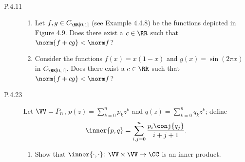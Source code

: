 \documentclass{homework}
\begin{document}
\begin{description}
  \begin{solution}

  \end{solution}

\item[P.4.11]
  \begin{enumerate}
  \item Let \(f, g \in C_\RR [0, 1]\) (see Example 4.4.8) be the
    functions depicted in Figure 4.9.  Does there exist a
    \(c \in \RR\) such that \(\norm{f + cg} < \norm f\)?

    \begin{solution}

    \end{solution}

  \item Consider the functions \(f(x) = x(1-x)\) and
    \(g(x) = \sin(2\pi x)\) in \(C_\RR [0, 1]\).  Does there exist a
    \(c \in \RR\) such that \(\norm{f + cg} < \norm f\)?

    \begin{solution}

    \end{solution}
  \end{enumerate}
  \begin{center}
    \hfil
    \hfil
    \hfil
  \end{center}

\item[P.4.23]
  Let \(\VV = P_n\), \(p(z) = \sum_{k=0}^n p_k z^k\) and
  \(q(z) = \sum_{k=0}^n q_k z^k\); define
  \[
    \inner{p, q} = \sum_{i,j=0}^n \frac{p_i \conj{q_j}}{i+j+1}.
  \]
  \begin{enumerate}
  \item Show that
    \(\inner{\cdot, \cdot} \colon \VV \times \VV \to \CC\) is an inner
    product.


\end{enumerate}
\end{description}
\end{document}

